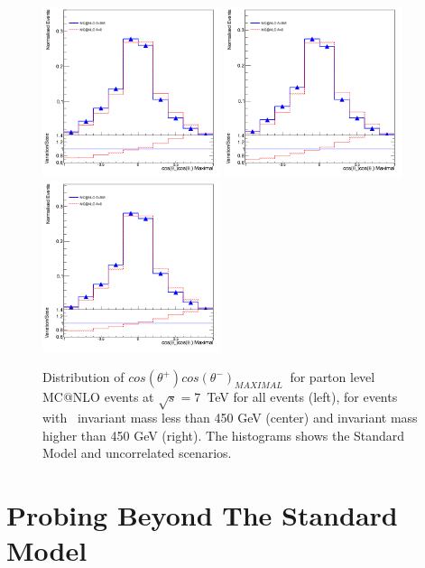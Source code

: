 \begin{figure}[htpb!]
\begin{center}
\includegraphics[width=52mm]{f/truth_coscos_op_truth_comparison}
\includegraphics[width=52mm]{f/truth_coscos_op_low_truth_comparison}
\includegraphics[width=52mm]{f/truth_coscos_op_high_truth_comparison}
\end{center}
\caption{Distribution of $cos(\theta^{+})cos(\theta^{-})_{MAXIMAL}~$ for parton level MC@NLO events at $\sqrt{s}=7$~TeV for all events (left), for events with \ttbar\ invariant mass less than 450 GeV (center) and invariant mass higher than 450 GeV (right). The histograms shows the Standard Model and uncorrelated scenarios. }
\label{fig:coscos}
\end{figure} 


\section{Probing Beyond The Standard Model}




